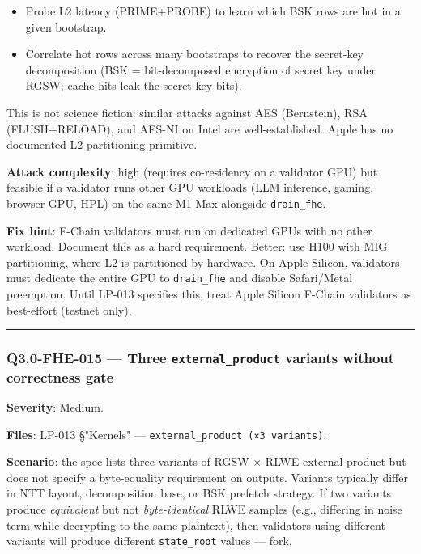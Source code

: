 \documentclass[
]{article}
\providecommand{\tightlist}{%
  \setlength{\itemsep}{0pt}\setlength{\parskip}{0pt}}
\begin{document}
\begin{itemize}
\tightlist
\item
  Probe L2 latency (PRIME+PROBE) to learn which BSK rows are hot in a
  given bootstrap.
\item
  Correlate hot rows across many bootstraps to recover the secret-key
  decomposition (BSK = bit-decomposed encryption of secret key under
  RGSW; cache hits leak the secret-key bits).
\end{itemize}

This is not science fiction: similar attacks against AES (Bernstein),
RSA (FLUSH+RELOAD), and AES-NI on Intel are well-established. Apple has
no documented L2 partitioning primitive.

\textbf{Attack complexity}: high (requires co-residency on a validator
GPU) but feasible if a validator runs other GPU workloads (LLM
inference, gaming, browser GPU, HPL) on the same M1 Max alongside
\texttt{drain\_fhe}.

\textbf{Fix hint}: F-Chain validators must run on dedicated GPUs with no
other workload. Document this as a hard requirement. Better: use H100
with MIG partitioning, where L2 is partitioned by hardware. On Apple
Silicon, validators must dedicate the entire GPU to \texttt{drain\_fhe}
and disable Safari/Metal preemption. Until LP-013 specifies this, treat
Apple Silicon F-Chain validators as best-effort (testnet only).

\begin{center}\rule{0.5\linewidth}{0.5pt}\end{center}

\subsubsection{\texorpdfstring{Q3.0-FHE-015 --- Three
\texttt{external\_product} variants without correctness
gate}{Q3.0-FHE-015 --- Three external\_product variants without correctness gate}}\label{q30-fhe-015--three-external_product-variants-without-correctness-gate}

\textbf{Severity}: Medium.

\textbf{Files}: LP-013 §"Kernels" ---
\texttt{external\_product\ (×3\ variants)}.

\textbf{Scenario}: the spec lists three variants of RGSW × RLWE external
product but does not specify a byte-equality requirement on outputs.
Variants typically differ in NTT layout, decomposition base, or BSK
prefetch strategy. If two variants produce \emph{equivalent} but not
\emph{byte-identical} RLWE samples (e.g., differing in noise term while
decrypting to the same plaintext), then validators using different
variants will produce different \texttt{state\_root} values --- fork.
\end{document}
